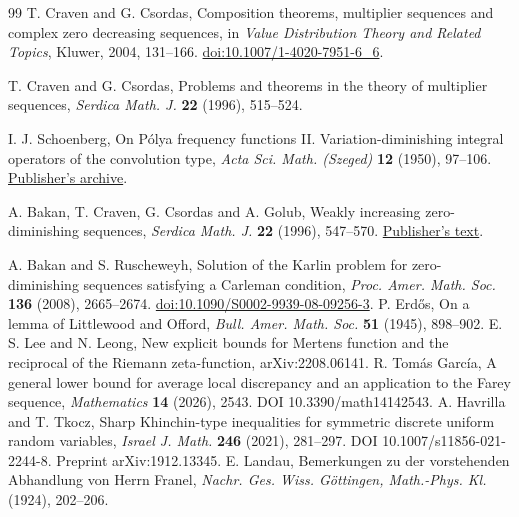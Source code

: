 \documentclass[11pt,a4paper]{article}
\begin{document}
\begin{thebibliography}{99}
T. Craven and G. Csordas, Composition theorems, multiplier sequences and
complex zero decreasing sequences, in \emph{Value Distribution Theory
and Related Topics}, Kluwer, 2004, 131--166.
\href{https://doi.org/10.1007/1-4020-7951-6_6}{doi:10.1007/1-4020-7951-6\_6}.

T. Craven and G. Csordas, Problems and theorems in the theory of
multiplier sequences, \emph{Serdica Math. J.} \textbf{22} (1996), 515--524.

I. J. Schoenberg, On P\'olya frequency functions II. Variation-diminishing
integral operators of the convolution type, \emph{Acta Sci. Math.
(Szeged)} \textbf{12} (1950), 97--106.
\href{https://acta.bibl.u-szeged.hu/13626/}{Publisher's archive}.

A. Bakan, T. Craven, G. Csordas and A. Golub, Weakly increasing
zero-diminishing sequences, \emph{Serdica Math. J.} \textbf{22} (1996),
547--570. \href{https://www.math.bas.bg/serdica/1996/1996-547-570.pdf}
{Publisher's text}.

A. Bakan and S. Ruscheweyh, Solution of the Karlin problem for
zero-diminishing sequences satisfying a Carleman condition,
\emph{Proc. Amer. Math. Soc.} \textbf{136} (2008), 2665--2674.
\href{https://doi.org/10.1090/S0002-9939-08-09256-3}
{doi:10.1090/S0002-9939-08-09256-3}.
P. Erd\H{o}s, On a lemma of Littlewood and Offord, \emph{Bull. Amer. Math. Soc.} \textbf{51} (1945), 898--902.
E. S. Lee and N. Leong, New explicit bounds for Mertens function and the reciprocal of the Riemann zeta-function, arXiv:2208.06141.
R. Tom\'as Garc\'ia, A general lower bound for average local discrepancy and an application to the Farey sequence, \emph{Mathematics} \textbf{14} (2026), 2543. DOI 10.3390/math14142543.
A. Havrilla and T. Tkocz, Sharp Khinchin-type inequalities for symmetric discrete uniform random variables, \emph{Israel J. Math.} \textbf{246} (2021), 281--297. DOI 10.1007/s11856-021-2244-8. Preprint arXiv:1912.13345.
E. Landau, Bemerkungen zu der vorstehenden Abhandlung von Herrn Franel, \emph{Nachr. Ges. Wiss. G\"ottingen, Math.-Phys. Kl.} (1924), 202--206.

\end{thebibliography}
\end{document}
